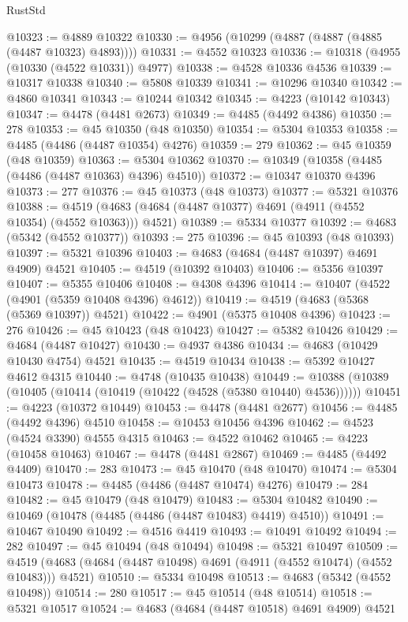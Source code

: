 \begin{lexlean}{RustStd}
\begin{coremodule}
@10323 := @4889 @10322
@10330 := @4956 (@10299 (@4887 (@4887 (@4885 (@4487 @10323) @4893))))
@10331 := @4552 @10323
@10336 := @10318 (@4955 (@10330 (@4522 @10331)) @4977)
@10338 := @4528 @10336 @4536
@10339 := @10317 @10338
@10340 := @5808 @10339
@10341 := @10296 @10340
@10342 := @4860 @10341
@10343 := @10244 @10342
@10345 := @4223 (@10142 @10343)
@10347 := @4478 (@4481 @2673)
@10349 := @4485 (@4492 @4386)
@10350 := 278
@10353 := @45 @10350 (@48 @10350)
@10354 := @5304 @10353
@10358 := @4485 (@4486 (@4487 @10354) @4276)
@10359 := 279
@10362 := @45 @10359 (@48 @10359)
@10363 := @5304 @10362
@10370 := @10349 (@10358 (@4485 (@4486 (@4487 @10363) @4396) @4510))
@10372 := @10347 @10370 @4396
@10373 := 277
@10376 := @45 @10373 (@48 @10373)
@10377 := @5321 @10376
@10388 := @4519 (@4683 (@4684 (@4487 @10377) @4691 (@4911 (@4552 @10354) (@4552 @10363))) @4521)
@10389 := @5334 @10377
@10392 := @4683 (@5342 (@4552 @10377))
@10393 := 275
@10396 := @45 @10393 (@48 @10393)
@10397 := @5321 @10396
@10403 := @4683 (@4684 (@4487 @10397) @4691 @4909) @4521
@10405 := @4519 (@10392 @10403)
@10406 := @5356 @10397
@10407 := @5355 @10406
@10408 := @4308 @4396
@10414 := @10407 (@4522 (@4901 (@5359 @10408 @4396) @4612))
@10419 := @4519 (@4683 (@5368 (@5369 @10397)) @4521)
@10422 := @4901 (@5375 @10408 @4396)
@10423 := 276
@10426 := @45 @10423 (@48 @10423)
@10427 := @5382 @10426
@10429 := @4684 (@4487 @10427)
@10430 := @4937 @4386
@10434 := @4683 (@10429 @10430 @4754) @4521
@10435 := @4519 @10434
@10438 := @5392 @10427 @4612 @4315
@10440 := @4748 (@10435 @10438)
@10449 := @10388 (@10389 (@10405 (@10414 (@10419 (@10422 (@4528 (@5380 @10440) @4536))))))
@10451 := @4223 (@10372 @10449)
@10453 := @4478 (@4481 @2677)
@10456 := @4485 (@4492 @4396) @4510
@10458 := @10453 @10456 @4396
@10462 := @4523 (@4524 @3390) @4555 @4315
@10463 := @4522 @10462
@10465 := @4223 (@10458 @10463)
@10467 := @4478 (@4481 @2867)
@10469 := @4485 (@4492 @4409)
@10470 := 283
@10473 := @45 @10470 (@48 @10470)
@10474 := @5304 @10473
@10478 := @4485 (@4486 (@4487 @10474) @4276)
@10479 := 284
@10482 := @45 @10479 (@48 @10479)
@10483 := @5304 @10482
@10490 := @10469 (@10478 (@4485 (@4486 (@4487 @10483) @4419) @4510))
@10491 := @10467 @10490
@10492 := @4516 @4419
@10493 := @10491 @10492
@10494 := 282
@10497 := @45 @10494 (@48 @10494)
@10498 := @5321 @10497
@10509 := @4519 (@4683 (@4684 (@4487 @10498) @4691 (@4911 (@4552 @10474) (@4552 @10483))) @4521)
@10510 := @5334 @10498
@10513 := @4683 (@5342 (@4552 @10498))
@10514 := 280
@10517 := @45 @10514 (@48 @10514)
@10518 := @5321 @10517
@10524 := @4683 (@4684 (@4487 @10518) @4691 @4909) @4521

\end{coremodule}
\end{lexlean}
